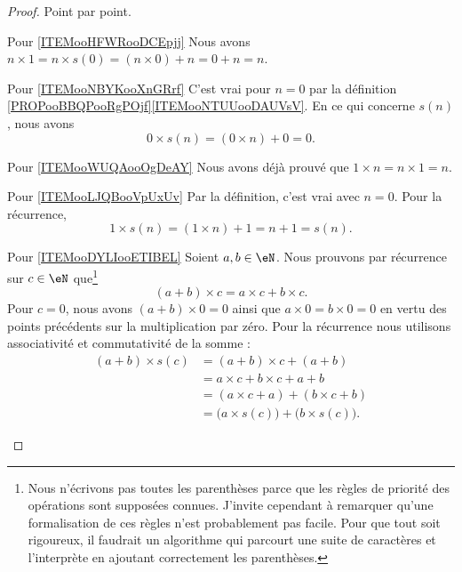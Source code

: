 \begin{proof}
    Point par point.
    \begin{subproof}
    \item[Pour \ref{ITEMooHFWRooDCEpjj}]
        Nous avons \( n\times 1=n\times s(0)=(n\times 0)+n=0+n=n\).
    \item[Pour \ref{ITEMooNBYKooXnGRrf}]
        C'est vrai pour \( n=0\) par la définition \ref{PROPooBBQPooRgPOjf}\ref{ITEMooNTUUooDAUVsV}. En ce qui concerne \( s(n)\), nous avons
        \begin{equation}
            0\times s(n)=(0\times n)+0=0.
        \end{equation}
    \item[Pour \ref{ITEMooWUQAooOgDeAY}]
        Nous avons déjà prouvé que \( 1\times n=n\times 1=n\).
    \item[Pour \ref{ITEMooLJQBooVpUxUv}]
        Par la définition, c'est vrai avec \( n=0\). Pour la récurrence, 
        \begin{equation}
            1\times s(n)=(1\times n)+1=n+1=s(n).
        \end{equation}
    \item[Pour \ref{ITEMooDYLIooETIBEL}]
        Soient \( a,b\in \eN\). Nous prouvons par récurrence sur \( c\in \eN\) que\footnote{Nous n'écrivons pas toutes les parenthèses parce que les règles de priorité des opérations sont supposées connues. J'invite cependant  à remarquer qu'une formalisation de ces règles n'est probablement pas facile. Pour que tout soit rigoureux, il faudrait un algorithme qui parcourt une suite de caractères et l'interprète en ajoutant correctement les parenthèses.}
        \begin{equation}
            (a+b)\times c=a\times c+b\times c.
        \end{equation}
        Pour \( c=0\), nous avons \( (a+b)\times 0=0\) ainsi que \( a\times 0=b\times 0=0\) en vertu des points précédents sur la multiplication par zéro. Pour la récurrence nous utilisons associativité et commutativité de la somme :
        \begin{subequations}
            \begin{align}
                (a+b)\times s(c)&=(a+b)\times c+(a+b)\\
                &=a\times c+b\times c+a+b\\
                &=(a\times c +a)+(b\times c+b)\\
                &=\big( a\times s(c) \big)+\big( b\times s(c) \big).

\end{align}
\end{subequations}
\end{subproof}
\end{proof}
